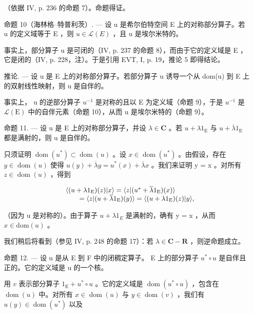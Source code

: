 （依据 IV, p. 236 的命题 7）。命题得证。

命题 10（海林格–特普利茨）. --- 设 u 是希尔伯特空间 E 上的对称部分算子。若 u 的定义域等于 E ，则 \(u \in \mathcal{L}(E)\) ，且 u 是埃尔米特的。

事实上，部分算子 u 是可闭的（IV, p. 237 的命题 8），而由于它的定义域是 E ，它是闭的（IV, p. 228，注）。于是引用 EVT, I, p. 19，推论 5 即得结论。

推论. --- 设 u 是 E 上的对称部分算子。若部分算子 u 诱导一个从 dom(u) 到 E 上的双射线性映射，则 u 是自伴的。

事实上， u 的逆部分算子 \(u^{-1}\) 是对称的且以 E 为定义域（命题 9），于是 \(u^{-1}\) 是 \(\mathcal{L}(\mathrm{E})\) 中的自伴元素（命题 10），从而 u 是埃尔米特的（命题 9）。

命题 11. --- 设 u 是 E 上的对称部分算子，并设 \(\lambda \in \mathbf{C}\) 。若 \(u + \lambda 1_{\mathrm{E}}\) 与 \(u + \overline{\lambda} 1_{\mathrm{E}}\) 都是满射的，则 u 是自伴的。

只须证明 \(\operatorname{dom}(u^{*}) \subset \operatorname{dom}(u)\) 。设 \(x \in \operatorname{dom}(u^{*})\) 。由假设，存在 \(y \in \operatorname{dom}(u)\) 使得 \(u(y) + \overline{\lambda}y = u^{*}(x) + \overline{\lambda}x\) 。我们来证明 y = x 。对所有 \(z \in \operatorname{dom}(u)\) ，得到

\[
\begin{array}{r l} & {\langle (u + \lambda 1 _ {\mathrm{E}}) (z) | x \rangle = \langle z | (u ^ {*} + \overline {{\lambda}} 1 _ {\mathrm{E}}) (x) \rangle} \\ & {\qquad = \langle z | (u + \overline {{\lambda}} 1 _ {\mathrm{E}}) (y) \rangle = \langle (u + \lambda 1 _ {\mathrm{E}}) (z) | y \rangle ,} \end{array}
\]

（因为 u 是对称的）。由于算子 \(u + \lambda1_{E}\) 是满射的，确有 y = x ，从而 \(x \in \text{dom}(u)\) 。

我们稍后将看到（参见 IV, p. 248 的命题 17）：若 \(\lambda \in \mathbf{C} - \mathbf{R}\) ，则逆命题成立。

命题 12. --- 设 u 是从 E 到 F 中的闭稠定算子。 E 上的部分算子 \(u^{*}\circ u\) 是自伴且正的。它的定义域是 u 的一个核。

用 \(v\) 表示部分算子 \(1_{\mathrm{E}} + u^{*} \circ u\) 。它的定义域是 \(\operatorname{dom}(u^{*} \circ u)\) ，包含在 \(\operatorname{dom}(u)\) 中。对所有 \(x \in \operatorname{dom}(u)\) 与 \(y \in \operatorname{dom}(v)\) ，我们有 \(u(y) \in \operatorname{dom}(u^{*})\) 以及

